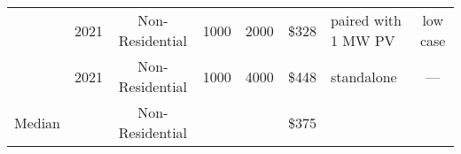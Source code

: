 \begin{tabular}{rccccclc}
\citet{LazardLCOSv7}               & 2021                                                                            & Non-Residential                                                         & 1000 & 2000 & \$328                   & paired with 1 MW PV                                                                                 & low case               \\
\citet{viswanathan2022}    & 2021                                                                            & Non-Residential                                                              & 1000                     & 4000                     & \$448                   & standalone                                                                                          &                 ---       \\ \hline
\multicolumn{1}{c}{Median}                     &                                                           & Non-Residential                                              &     &      & \$375                   &                                                                                                     &                       \\\hline
\end{tabular}